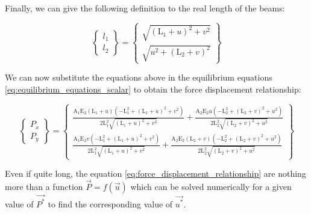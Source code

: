 Finally, we can give the following definition to the real length of the beams:

\begin{equation}
    \begin{Bmatrix}
        l_1 \\
        l_2
    \end{Bmatrix}
    =
    \begin{Bmatrix}
        \sqrt{(\text{L}_1+u)^2+v^2} \\
        \sqrt{u^2+(\text{L}_2+v)^2}
    \end{Bmatrix}
    \label{eq:real_length}
\end{equation}

We can now substitute the equations above in the equilibrium equations \ref{eq:equilibrium_equations_scalar} to obtain the force displacement relationship:

\begin{equation}
    \begin{Bmatrix}
        P_x \\
        P_y
    \end{Bmatrix}
    =
    \begin{Bmatrix}
        \frac{\text{A}_1 \text{E}_2 (\text{L}_1+u) \left(-\text{L}_1^2+(\text{L}_1+u)^2+v^2\right)}{2 \text{L}_1^2 \sqrt{(\text{L}_1+u)^2+v^2}}+\frac{\text{A}_2 \text{E}_2 u \left(-\text{L}_2^2+(\text{L}_2+v)^2+u^2\right)}{2 \text{L}_2^2 \sqrt{(\text{L}_2+v)^2+u^2}} \\
        \frac{\text{A}_1 \text{E}_2 v \left(-\text{L}_1^2+(\text{L}_1+u)^2+v^2\right)}{2 \text{L}_1^2 \sqrt{(\text{L}_1+u)^2+v^2}}+\frac{\text{A}_2 \text{E}_2 (\text{L}_2+v) \left(-\text{L}_2^2+(\text{L}_2+v)^2+u^2\right)}{2 \text{L}_2^2 \sqrt{(\text{L}_2+v)^2+u^2}}
    \end{Bmatrix}
    \label{eq:force_displacement_relationship}
\end{equation}

Even if quite long, the equation \ref{eq:force_displacement_relationship} are nothing more than a function ${\vec{P}} = f({\vec{u}})$ which can be solved numerically for a given value of ${\vec{P^*}}$ to find the corresponding value of ${\vec{u^*}}$.
